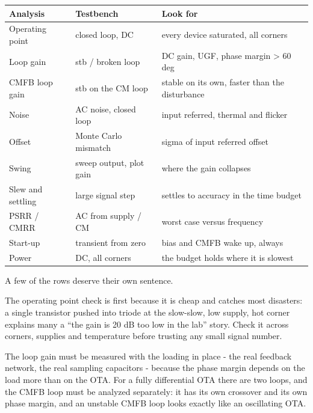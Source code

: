 \begin{longtable}[]{@{}
  >{\raggedright\arraybackslash}p{}
  >{\raggedright\arraybackslash}p{}
  >{\raggedright\arraybackslash}p{}@{}}
\toprule\noalign{}
\begin{minipage}[b]{\linewidth}\raggedright
Analysis
\end{minipage} & \begin{minipage}[b]{\linewidth}\raggedright
Testbench
\end{minipage} & \begin{minipage}[b]{\linewidth}\raggedright
Look for
\end{minipage} \\
\midrule\noalign{}
\endhead
\bottomrule\noalign{}
\endlastfoot
Operating point & closed loop, DC & every device saturated, all
corners \\
Loop gain & stb / broken loop & DC gain, UGF, phase margin
\textgreater{} 60 deg \\
CMFB loop gain & stb on the CM loop & stable on its own, faster than the
disturbance \\
Noise & AC noise, closed loop & input referred, thermal and flicker \\
Offset & Monte Carlo mismatch & sigma of input referred offset \\
Swing & sweep output, plot gain & where the gain collapses \\
Slew and settling & large signal step & settles to accuracy in the time
budget \\
PSRR / CMRR & AC from supply / CM & worst case versus frequency \\
Start-up & transient from zero & bias and CMFB wake up, always \\
Power & DC, all corners & the budget holds where it is slowest \\
\end{longtable}

A few of the rows deserve their own sentence.

The operating point check is first because it is cheap and catches most
disasters: a single transistor pushed into triode at the slow-slow, low
supply, hot corner explains many a ``the gain is 20 dB too low in the
lab'' story. Check it across corners, supplies and temperature before
trusting any small signal number.

The loop gain must be measured with the loading in place - the real
feedback network, the real sampling capacitors - because the phase
margin depends on the load more than on the OTA. For a fully
differential OTA there are two loops, and the CMFB loop must be analyzed
separately: it has its own crossover and its own phase margin, and an
unstable CMFB loop looks exactly like an oscillating OTA.

